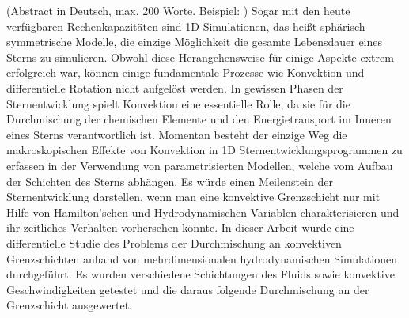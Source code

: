 (Abstract in Deutsch, max. 200 Worte. Beispiel: \cite{loremIpsum})
Sogar mit den heute verfügbaren Rechenkapazitäten sind 1D Simulationen, das heißt sphärisch symmetrische Modelle, die einzige Möglichkeit die gesamte Lebensdauer eines Sterns zu simulieren. Obwohl diese Herangehensweise für einige Aspekte extrem erfolgreich war, können einige fundamentale Prozesse wie Konvektion und differentielle Rotation nicht aufgelöst werden. In gewissen Phasen der Sternentwicklung spielt Konvektion eine essentielle Rolle, da sie für die Durchmischung der chemischen Elemente und den Energietransport im Inneren eines Sterns verantwortlich ist. Momentan besteht der einzige Weg die makroskopischen Effekte von Konvektion in 1D Sternentwicklungsprogrammen zu erfassen in der Verwendung von parametrisierten Modellen, welche vom Aufbau der Schichten des Sterns abhängen. Es würde einen Meilenstein der Sternentwicklung darstellen, wenn man eine konvektive Grenzschicht nur mit Hilfe von Hamilton'schen und Hydrodynamischen Variablen charakterisieren und ihr zeitliches Verhalten vorhersehen könnte. In dieser Arbeit wurde eine differentielle Studie des Problems der Durchmischung an konvektiven Grenzschichten anhand von mehrdimensionalen hydrodynamischen Simulationen durchgeführt. Es wurden verschiedene Schichtungen des Fluids sowie konvektive Geschwindigkeiten getestet und die daraus folgende Durchmischung an der Grenzschicht ausgewertet.
